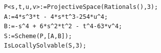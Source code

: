 \documentclass[a4paper,12pt,english,reqno]{amsart}
\begin{document}
\begin{lstlisting}
P<s,t,u,v>:=ProjectiveSpace(Rationals(),3);
A:=4*s^3*t - 4*s*t^3-254*u^4;
B:=-s^4 + 6*s^2*t^2 - t^4-63*v^4;
S:=Scheme(P,[A,B]);
IsLocallySolvable(S,3);
\end{lstlisting}


%
%
%
%
%
%
%
%
\end{document}
